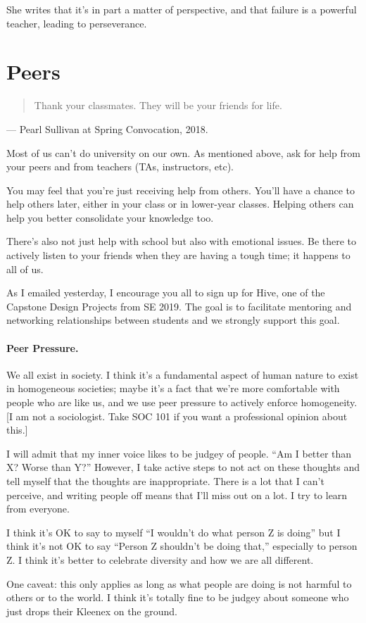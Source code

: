 \documentclass[11pt]{article}
\begin{document}
She writes that it's in part a matter of perspective, and that failure is a powerful teacher, leading to perseverance.

\section*{Peers}
\begin{quote}
  Thank your classmates. They will be your friends for life.
\end{quote}
\hfill --- Pearl Sullivan at Spring Convocation, 2018.

Most of us can't do university on our own. As mentioned above, ask for help from your peers and from teachers
(TAs, instructors, etc).

You may feel that you're just receiving help from others. You'll have
a chance to help others later, either in your class or in lower-year
classes. Helping others can help you better consolidate your knowledge
too.

There's also not just help with school but also with emotional
issues. Be there to actively listen to your friends when they are having a
tough time; it happens to all of us.

As I emailed yesterday, I encourage you all to sign up for Hive, one
of the Capstone Design Projects from SE 2019. The goal is to facilitate
mentoring and networking relationships between students and we strongly
support this goal.

\paragraph{Peer Pressure.}
We all exist in society. I think it's a fundamental aspect of human nature
to exist in homogeneous societies; maybe it's a fact that we're more comfortable
with people who are like us, and we use peer pressure to actively enforce homogeneity.
[I am not a sociologist. Take SOC 101 if you want a professional opinion about this.]

I will admit that my inner voice likes to be judgey of people. ``Am I
better than X?  Worse than Y?'' However, I take active steps to not
act on these thoughts and tell myself that the thoughts are
inappropriate. There is a lot that I can't perceive, and writing
people off means that I'll miss out on a lot. I try to learn from everyone.

I think it's OK to say to myself ``I wouldn't do what person Z is doing''
but I think it's not OK to say ``Person Z shouldn't be doing that,''
especially to person Z. I think it's better to celebrate diversity and
how we are all different.

One caveat: this only applies as long as what people are doing is not
harmful to others or to the world. I think it's totally fine to be judgey
about someone who just drops their Kleenex on the ground.
\end{document}
